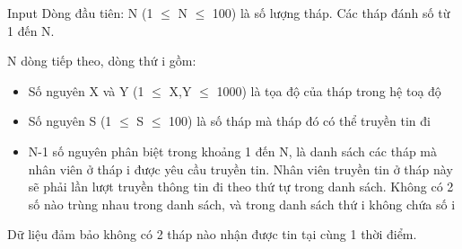 Input
Dòng đầu tiên: N (1  $\le$  N  $\le$  100) là số lượng tháp. Các tháp đánh số từ 1 đến N.

N dòng tiếp theo, dòng thứ i gồm:
\begin{itemize}
	\item Số nguyên X và Y (1 $\le$ X,Y $\le$ 1000) là tọa độ của tháp trong hệ toạ độ
	\item Số nguyên S (1 $\le$ S $\le$ 100) là số tháp mà tháp đó có thể truyền tin đi
	\item N-1 số nguyên phân biệt trong khoảng 1 đến N, là danh sách các tháp mà nhân viên ở tháp i được yêu cầu truyền tin. Nhân viên truyền tin ở tháp này sẽ phải lần lượt truyền thông tin đi theo thứ tự trong danh sách. Không có 2 số nào trùng nhau trong danh sách, và trong danh sách thứ i không chứa số i
\end{itemize}

Dữ liệu đảm bảo không có 2 tháp nào nhận được tin tại cùng 1 thời điểm.